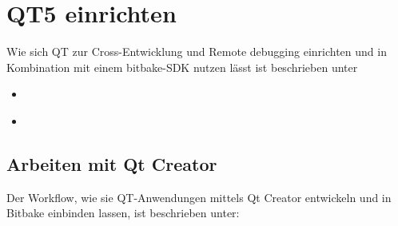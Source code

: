 
\chapter{QT5 einrichten}%
\label{cha:qt5_einrichten}

Wie sich QT zur Cross-Entwicklung und Remote debugging einrichten und in
Kombination mit einem bitbake-SDK nutzen lässt ist beschrieben unter

\begin{itemize}
    \item \cite[Seite
        269-276]{Gonzalez2018:Embedded_Linux_Development_Using_Yocto_Project_Cookbook_2nd}
    \item \cite [Working with Qt Creator]{PhyTec:Development_Guid}
\end{itemize}

\section{Arbeiten mit Qt Creator}%
\label{sec:arbeiten_mit_qt_creator}

Der Workflow, wie sie QT-Anwendungen mittels Qt Creator entwickeln und in
Bitbake einbinden lassen, ist beschrieben unter:
    \cite[Seite
        277-285]{Gonzalez2018:Embedded_Linux_Development_Using_Yocto_Project_Cookbook_2nd}


